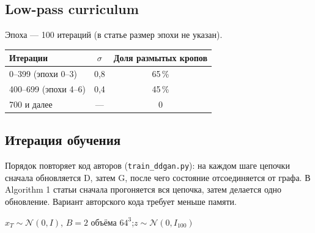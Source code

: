 \documentclass[11pt,a4paper]{article}
\newcommand{\code}[1]{\texttt{#1}}
\begin{document}
\subsection{Low-pass curriculum}\label{sec:curr}
Эпоха — 100 итераций (в статье размер эпохи не указан).
\begin{center}
\small
\begin{tabular}{@{}lcc@{}}
\toprule
Итерации & $\sigma$ & Доля размытых кропов \\
\midrule
0--399 (эпохи 0--3) & 0{,}8 & 65\,\% \\
400--699 (эпохи 4--6) & 0{,}4 & 45\,\% \\
700 и далее & — & 0 \\
\bottomrule
\end{tabular}
\end{center}

\subsection{Итерация обучения}
Порядок повторяет код авторов (\code{train\_ddgan.py}): на каждом шаге цепочки сначала обновляется D,
затем G, после чего состояние отсоединяется от графа. В Algorithm 1 статьи сначала прогоняется вся
цепочка, затем делается одно обновление. Вариант авторского кода требует меньше памяти.

\begin{algorithm}[H]
\caption{Одна итерация (\code{Trainer.train\_iter})}
$x_T\sim\mathcal N(0,I)$, $B=2$ объёма $64^3$;\quad $z\sim\mathcal N(0,I_{100})$\;
\end{algorithm}
\end{document}
